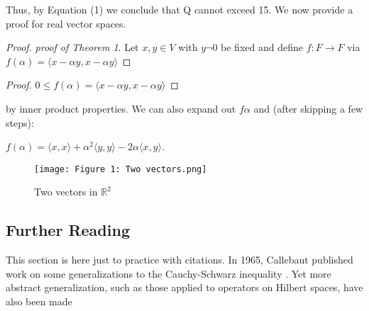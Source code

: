 \documentclass[12pt]{article}
\begin{document}
Thus, by Equation (1) we conclude that Q cannot exceed 15. We now provide a proof for real vector spaces.



\begin{proof} \textit{proof of Theorem 1}. Let $x,y \in V$ with $y \neg 0$ be fixed and define $f : F \rightarrow F$ via $f( \alpha )  = \langle x - \alpha y, x - \alpha y \rangle $

\end{proof}

\begin{proof}

$0 \le f(\alpha) = \langle x-\alpha y, x-\alpha y \rangle$

\end{proof}

\noindent 
by inner product properties. We can also expand out $f\alpha$ and (after skipping a few steps):


$f(\alpha)= \langle x,x \rangle + \alpha^2 \langle y,y \rangle -2\alpha \langle x,y \rangle$.




\newpage



\begin{figure}[htp]
    \centering
    \texttt{[image: Figure 1: Two vectors.png]}
    \caption{Two vectors in $\mathbb{R}^2$ }
    \label{fig:vector}
\end{figure}


\subsection{Further Reading}
This section is here just to practice with citations. In 1965, Callebaut published work on some generalizations to the Cauchy-Schwarz
inequality \cite{callebaut1965generalization}. Yet more abstract generalization, such as those applied to operators on Hilbert spaces, have also been made \cite{bhatia1995cauchy}





\end{document}
